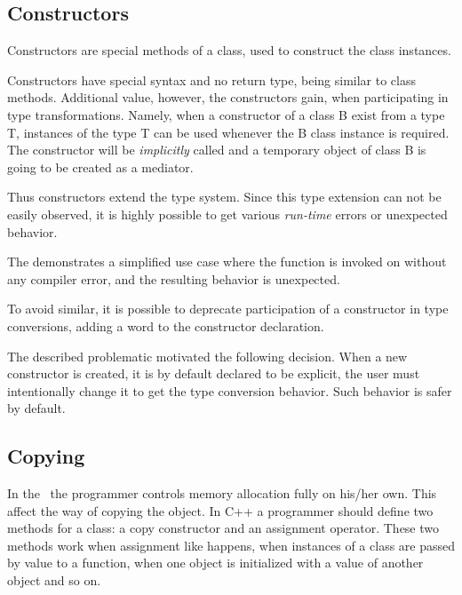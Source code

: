 \subsection{Constructors}
\label{classconstructors}

Constructors are special methods of a class, used to construct the class instances. 

Constructors have special syntax and no return type, being similar to class methods. Additional 
value, however, the constructors gain, when participating in type transformations. Namely, when
a constructor of a class B exist from a type T, instances of the type T can be used whenever
the B class instance is required. The constructor will be \emph{implicitly} called and a temporary object
of class B is going to be created as a mediator. 

Thus constructors extend the type system. Since this type extension can not be easily observed, it is 
highly possible to get various \emph{run-time} errors or unexpected behavior. 


The  demonstrates a simplified use case where the function  is invoked on  without 
any compiler error, and the resulting behavior is unexpected.

To avoid similar, it is possible to deprecate participation of a constructor in type conversions, adding a word  to the constructor
declaration.

The described problematic motivated the following decision. When a new constructor is created, it is by default declared to be explicit,
the user must intentionally change it to get the type conversion behavior. Such behavior is safer by default.

\subsection{Copying}
\label{classcopying}

In the \cpppl\ the programmer controls memory allocation fully on his/her own. This affect the way of copying the object.
In C++ a programmer should define two methods for a class: a copy constructor and an assignment operator.
These two methods work when assignment like  happens, when instances of a class are passed by value to a function, 
when one object is initialized with a value of another object and so on.

